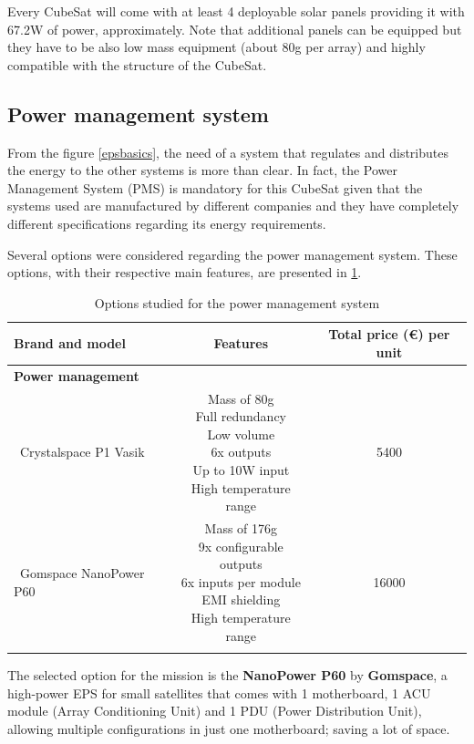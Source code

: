 Every CubeSat will come with at least 4 deployable solar panels providing it with 67.2W of power, approximately. Note that additional panels can be equipped but they have to be also low mass equipment (about 80g per array) and highly compatible with the structure of the CubeSat.

\subsection{Power management system}
From the figure \ref{epsbasics}, the need of a system that regulates and distributes the energy to the other systems is more than clear. In fact, the  Power Management System (PMS) is mandatory for this CubeSat given that the systems used are manufactured by different companies and they have completely different specifications regarding its energy requirements.

Several options were considered regarding the power management system. These options, with their respective main features, are presented in \ref{optionspowermanagementsystem}.

\pagebreak
\begin{longtable}{| l | c | c | }
\hline
\rowcolor[gray]{0.80}	\textbf{Brand and model} &  \textbf{Features}     & \textbf{Total price (\euro) per unit}   \\
\hline
\endfirsthead
\rowcolor[gray]{0.85} \textbf{Power management} &  &  \\
	   ~Crystalspace P1 Vasik & \makecell{Mass of 80g \\ Full redundancy \\ Low volume \\ 6x outputs \\ Up to 10W input \\ High temperature range} & 5400 \\
	\hline
	   ~Gomspace NanoPower P60 & \makecell{Mass of 176g \\ 9x configurable outputs \\ 6x inputs per module \\ EMI shielding \\ High temperature range} & 16000 \\
	\hline
\caption{Options studied for the power management system}
\label{optionspowermanagementsystem}
\end{longtable}

The selected option for the mission is the \textbf{NanoPower P60} by \textbf{Gomspace}, a high-power EPS for small satellites that comes with 1 motherboard, 1 ACU module (Array Conditioning Unit) and 1 PDU (Power Distribution Unit), allowing multiple configurations in just one motherboard; saving a lot of space.


